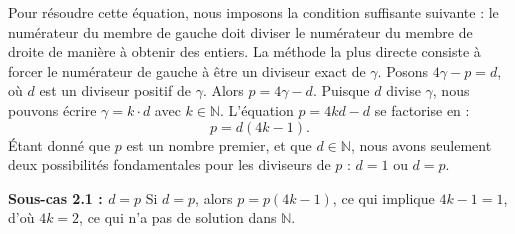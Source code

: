 \documentclass[12pt, a4paper]{article}
\begin{document}
Pour résoudre cette équation, nous imposons la condition suffisante suivante : le numérateur du membre de gauche doit diviser le numérateur du membre de droite de manière à obtenir des entiers. La méthode la plus directe consiste à forcer le numérateur de gauche à être un diviseur exact de $\gamma$.
Posons $4\gamma - p = d$, où $d$ est un diviseur positif de $\gamma$.
Alors $p = 4\gamma - d$.
Puisque $d$ divise $\gamma$, nous pouvons écrire $\gamma = k \cdot d$ avec $k \in \mathbb{N}$.
L'équation $p = 4kd - d$ se factorise en :
\begin{equation}
p = d(4k - 1).
\end{equation}
Étant donné que $p$ est un nombre premier, et que $d \in \mathbb{N}$, nous avons seulement deux possibilités fondamentales pour les diviseurs de $p$ : $d = 1$ ou $d = p$.

\textbf{Sous-cas 2.1 : $d = p$}
Si $d = p$, alors $p = p(4k - 1)$, ce qui implique $4k - 1 = 1$, d'où $4k = 2$, ce qui n'a pas de solution dans $\mathbb{N}$.
\end{document}

